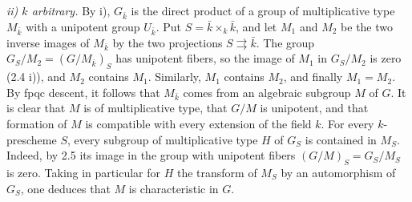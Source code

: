 \par\noindent\emph{ii) $k$ arbitrary.}
By i), $G_{\bar k}$ is the direct product of a group of multiplicative type $M_{\bar k}$ with a unipotent group $U_{\bar k}$. Put $S=\bar k\times_k\bar k$, and let $M_1$ and $M_2$ be the two inverse images of $M_{\bar k}$ by the two projections $S\rightrightarrows\bar k$. The group $G_S/M_2=(G/M_{\bar k})_S$ has unipotent fibers, so the image of $M_1$ in $G_S/M_2$ is zero (2.4 i)), and $M_2$ contains $M_1$. Similarly, $M_1$ contains $M_2$, and finally $M_1=M_2$. By fpqc descent, it follows that $M_{\bar k}$ comes from an algebraic subgroup $M$ of $G$. It is clear that $M$ is of multiplicative type, that $G/M$ is unipotent, and that formation of $M$ is compatible with every extension of the field $k$. For every $k$-prescheme $S$, every subgroup of multiplicative type $H$ of $G_S$ is contained in $M_S$. Indeed, by 2.5 its image in the group with unipotent fibers $(G/M)_S=G_S/M_S$ is zero. Taking in particular for $H$ the transform of $M_S$ by an automorphism of $G_S$, one deduces that $M$ is characteristic in $G$.

